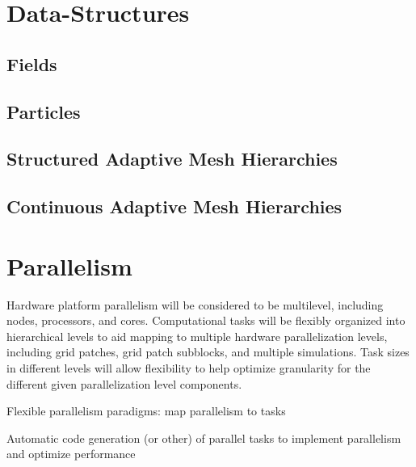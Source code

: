 \documentclass{book}
\begin{document}
\section{Data-Structures}

\subsection{Fields}

\subsection{Particles}

\subsection{Structured Adaptive Mesh Hierarchies}

\subsection{Continuous Adaptive Mesh Hierarchies}

\section{Parallelism}

Hardware platform parallelism will be considered to be multilevel,
including nodes, processors, and cores.  Computational tasks will be
flexibly organized into hierarchical levels to aid mapping to multiple
hardware parallelization levels, including grid patches, grid patch
subblocks, and multiple simulations.  Task sizes in different levels
will allow flexibility to help optimize granularity for the different
given parallelization level components.

Flexible parallelism paradigms: map parallelism to tasks

Automatic code generation (or other) of parallel tasks to implement
parallelism and optimize performance
\end{document}
